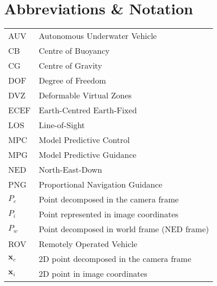 \chapter{Abbreviations \& Notation}
\begin{center}
\begin{tabular}{|l|l|}
\hline
AUV & Autonomous Underwater Vehicle \\
CB & Centre of Buoyancy\\
CG & Centre of Gravity \\
DOF & Degree of Freedom \\
DVZ & Deformable Virtual Zones \\
ECEF & Earth-Centred Earth-Fixed \\
LOS & Line-of-Sight\\
MPC & Model Predictive Control \\
MPG & Model Predictive Guidance\\
NED & North-East-Down \\
PNG & Proportional Navigation Guidance \\
$P_c$ & Point decomposed in the camera frame \\
$P_i$ & Point represented in image coordinates \\
$P_w$ & Point decomposed in world frame (NED frame) \\
ROV & Remotely Operated Vehicle \\
$\mathbf{x}_c$ & 2D point decomposed in the camera frame \\
$\mathbf{x}_i$ & 2D point in image coordinates \\
\hline
\end{tabular}
\end{center}
